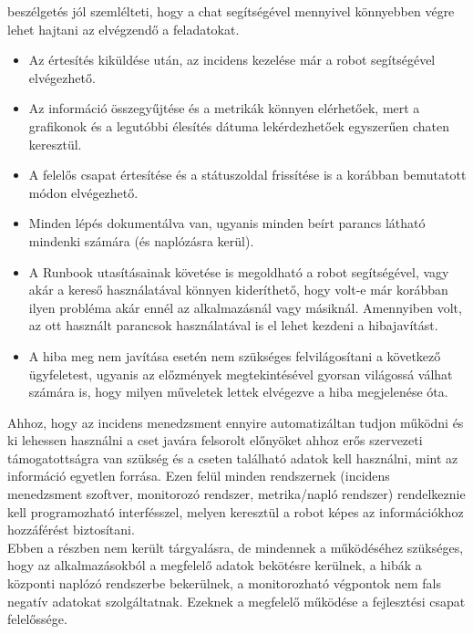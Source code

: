  beszélgetés jól szemlélteti, hogy a chat segítségével mennyivel könnyebben végre lehet hajtani az elvégzendő a feladatokat.\\
\begin{itemize}
  \item Az értesítés kiküldése után, az incidens kezelése már a robot segítségével elvégezhető.
  \item Az információ összegyűjtése és a metrikák könnyen elérhetőek, mert a grafikonok és a legutóbbi élesítés dátuma lekérdezhetőek egyszerűen chaten keresztül.
  \item A felelős csapat értesítése és a státuszoldal frissítése is a korábban bemutatott módon elvégezhető.
  \item Minden lépés dokumentálva van, ugyanis minden beírt parancs látható mindenki számára (és naplózásra kerül).
  \item A Runbook utasításainak követése is megoldható a robot segítségével, vagy akár a kereső használatával könnyen kideríthető, hogy volt-e már korábban ilyen probléma akár ennél az alkalmazásnál vagy másiknál. Amennyiben volt, az ott használt parancsok használatával is el lehet kezdeni a hibajavítást.
  \item A hiba meg nem javítása esetén nem szükséges felvilágosítani a következő ügyfeletest, ugyanis az előzmények megtekintésével gyorsan világossá válhat számára is, hogy milyen műveletek lettek elvégezve a hiba megjelenése óta.
\end{itemize}

Ahhoz, hogy az incidens menedzsment ennyire automatizáltan tudjon működni és ki lehessen használni a cset javára felsorolt előnyöket ahhoz erős szervezeti támogatottságra van szükség és a cseten található adatok kell használni, mint az információ egyetlen forrása. Ezen felül minden rendszernek (incidens menedzsment szoftver, monitorozó rendszer, metrika/napló rendszer) rendelkeznie kell programozható interfésszel, melyen keresztül a robot képes az információkhoz hozzáférést biztosítani.\\
Ebben a részben nem került tárgyalásra, de mindennek a működéséhez szükséges, hogy az alkalmazásokból a megfelelő adatok bekötésre kerülnek, a hibák a központi naplózó rendszerbe bekerülnek, a monitorozható végpontok nem fals negatív adatokat szolgáltatnak. Ezeknek a megfelelő működése a fejlesztési csapat felelőssége.